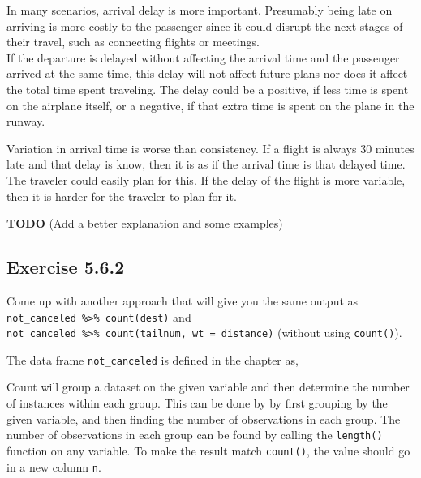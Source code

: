 \documentclass[]{book}
\newenvironment{Shaded}{\begin{snugshade}}{\end{snugshade}}
\newcommand{\KeywordTok}[1]{\textcolor[rgb]{0.13,0.29,0.53}{\textbf{#1}}}
\newcommand{\NormalTok}[1]{#1}
\newcommand{\OperatorTok}[1]{\textcolor[rgb]{0.81,0.36,0.00}{\textbf{#1}}}
\newcommand{\StringTok}[1]{\textcolor[rgb]{0.31,0.60,0.02}{#1}}
\theoremstyle{plain}
\theoremstyle{remark}
\theoremstyle{definition}
\theoremstyle{definition}
\theoremstyle{definition}
\theoremstyle{remark}
\begin{document}
In many scenarios, arrival delay is more important. Presumably being
late on arriving is more costly to the passenger since it could disrupt
the next stages of their travel, such as connecting flights or
meetings.\\
If the departure is delayed without affecting the arrival time and the
passenger arrived at the same time, this delay will not affect future
plans nor does it affect the total time spent traveling. The delay could
be a positive, if less time is spent on the airplane itself, or a
negative, if that extra time is spent on the plane in the runway.

Variation in arrival time is worse than consistency. If a flight is
always 30 minutes late and that delay is know, then it is as if the
arrival time is that delayed time. The traveler could easily plan for
this. If the delay of the flight is more variable, then it is harder for
the traveler to plan for it.

\textbf{TODO} (Add a better explanation and some examples)

\hypertarget{exercise-5.6.2}{%
\subsection*{\texorpdfstring{Exercise
{5.6.2}}{Exercise 5.6.2}}\label{exercise-5.6.2}}

Come up with another approach that will give you the same output as
\texttt{not\_canceled\ \%\textgreater{}\%\ count(dest)} and
\texttt{not\_canceled\ \%\textgreater{}\%\ count(tailnum,\ wt\ =\ distance)}
(without using \texttt{count()}).

The data frame \texttt{not\_canceled} is defined in the chapter as,

\begin{Shaded}
\end{Shaded}

Count will group a dataset on the given variable and then determine the
number of instances within each group. This can be done by by first
grouping by the given variable, and then finding the number of
observations in each group. The number of observations in each group can
be found by calling the \texttt{length()} function on any variable. To
make the result match \texttt{count()}, the value should go in a new
column \texttt{n}.
\end{document}
